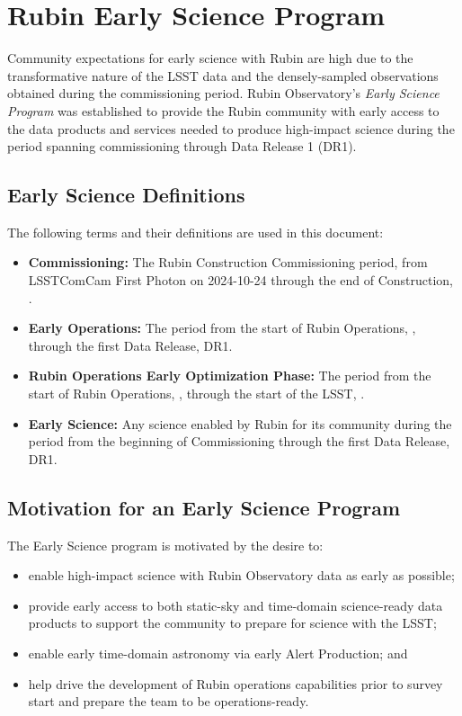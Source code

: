 \section{Rubin Early Science Program}

Community expectations for early science with Rubin are high due to the transformative nature of the LSST data and the densely-sampled observations obtained during the commissioning period.
Rubin Observatory's \emph{Early Science Program} was established to provide the Rubin community with early access to the data products and services needed to produce high-impact science during the period  spanning commissioning through Data Release 1 (DR1).

\subsection{Early Science Definitions}
\label{ssec:defn}

The following terms and their definitions are used in this document:
\begin{itemize}

\item\textbf{Commissioning:} The Rubin Construction Commissioning period, from LSSTComCam First Photon on 2024-10-24 through the end of Construction, \cstrcompdate.
\item\textbf{Early Operations:} The period from the start of Rubin Operations, \opsstartdate,  through the first Data Release, DR1.

\item\textbf{Rubin Operations Early Optimization Phase:} The period from the start of Rubin Operations, \opsstartdate, through the start of the LSST, \lsststartdate.

\item\textbf{Early Science:} Any science enabled by Rubin for its community during the period from the beginning of Commissioning through the first Data Release, DR1.
\end{itemize}

\subsection{Motivation for an Early Science Program} 
 \label{ssec:motivation}
The Early Science program is motivated by the desire to:
\begin{itemize}
\item enable high-impact science with Rubin Observatory data as early as possible;
\item provide early access to both static-sky and time-domain science-ready data products to support the community to prepare for science with the LSST;
\item enable early time-domain astronomy via early Alert Production; and 
\item help drive the development of Rubin operations capabilities prior to survey start and prepare the team to be operations-ready.
\end{itemize}

